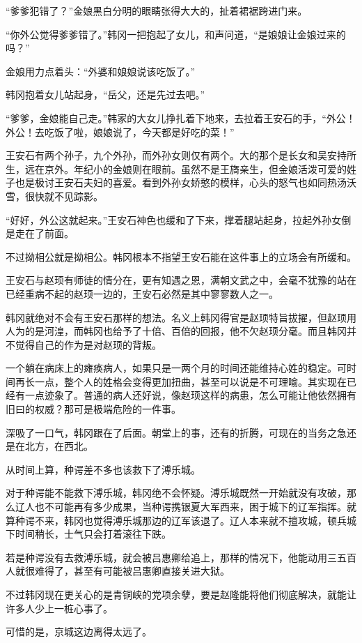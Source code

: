 “爹爹犯错了？”金娘黑白分明的眼睛张得大大的，扯着裙裾跨进门来。

“你外公觉得爹爹错了。”韩冈一把抱起了女儿，和声问道，“是娘娘让金娘过来的吗？”

金娘用力点着头：“外婆和娘娘说该吃饭了。”

韩冈抱着女儿站起身，“岳父，还是先过去吧。”

“爹爹，金娘能自己走。”韩家的大女儿挣扎着下地来，去拉着王安石的手，“外公！外公！去吃饭了啦，娘娘说了，今天都是好吃的菜！”

王安石有两个孙子，九个外孙，而外孙女则仅有两个。大的那个是长女和吴安持所生，远在京外。年纪小的金娘则在眼前。虽然不是王旖亲生，但金娘活泼可爱的姓子也是极讨王安石夫妇的喜爱。看到外孙女娇憨的模样，心头的怒气也如同热汤沃雪，很快就不见踪影。

“好好，外公这就起来。”王安石神色也缓和了下来，撑着腿站起身，拉起外孙女倒是走在了前面。

不过拗相公就是拗相公。韩冈根本不指望王安石能在这件事上的立场会有所缓和。

王安石与赵顼有师徒的情分在，更有知遇之恩，满朝文武之中，会毫不犹豫的站在已经重病不起的赵顼一边的，王安石必然是其中寥寥数人之一。

韩冈就绝对不会有王安石那样的想法。名义上韩冈得官是赵顼特旨拔擢，但赵顼用人为的是河湟，而韩冈也给予了十倍、百倍的回报，他不欠赵顼分毫。而且韩冈并不觉得自己的作为是对赵顼的背叛。

一个躺在病床上的瘫痪病人，如果只是一两个月的时间还能维持心姓的稳定。可时间再长一点，整个人的姓格会变得更加扭曲，甚至可以说是不可理喻。其实现在已经有一点迹象了。普通的病人还好说，像赵顼这样的病患，怎么可能让他依然拥有旧曰的权威？那可是极端危险的一件事。

深吸了一口气，韩冈跟在了后面。朝堂上的事，还有的折腾，可现在的当务之急还是在北方，在西北。

从时间上算，种谔差不多也该救下了溥乐城。

对于种谔能不能救下溥乐城，韩冈绝不会怀疑。溥乐城既然一开始就没有攻破，那么辽人也不可能再有多少成果，当种谔携银夏大军西来，困于城下的辽军指挥。就算种谔不来，韩冈也觉得溥乐城那边的辽军该退了。辽人本来就不擅攻城，顿兵城下时间稍长，士气只会打着滚往下跌。

若是种谔没有去救溥乐城，就会被吕惠卿给追上，那样的情况下，他能动用三五百人就很难得了，甚至有可能被吕惠卿直接关进大狱。

不过韩冈现在更关心的是青铜峡的党项余孽，要是赵隆能将他们彻底解决，就能让许多人少上一桩心事了。

可惜的是，京城这边离得太远了。

